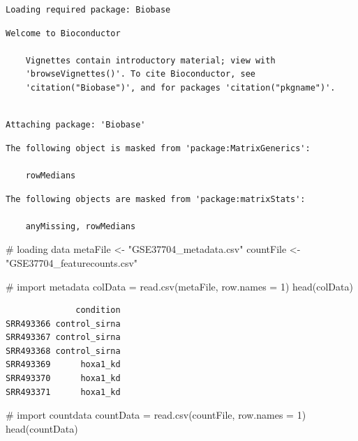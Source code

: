 \documentclass[
  letterpaper,
  DIV=11,
  numbers=noendperiod]{scrartcl}
\newenvironment{Shaded}{\begin{snugshade}}{\end{snugshade}}
\newcommand{\AttributeTok}[1]{\textcolor[rgb]{0.40,0.45,0.13}{#1}}
\newcommand{\CommentTok}[1]{\textcolor[rgb]{0.37,0.37,0.37}{#1}}
\newcommand{\DecValTok}[1]{\textcolor[rgb]{0.68,0.00,0.00}{#1}}
\newcommand{\FunctionTok}[1]{\textcolor[rgb]{0.28,0.35,0.67}{#1}}
\newcommand{\NormalTok}[1]{\textcolor[rgb]{0.00,0.23,0.31}{#1}}
\newcommand{\OtherTok}[1]{\textcolor[rgb]{0.00,0.23,0.31}{#1}}
\newcommand{\StringTok}[1]{\textcolor[rgb]{0.13,0.47,0.30}{#1}}
\begin{document}
\begin{verbatim}
Loading required package: Biobase
\end{verbatim}

\begin{verbatim}
Welcome to Bioconductor

    Vignettes contain introductory material; view with
    'browseVignettes()'. To cite Bioconductor, see
    'citation("Biobase")', and for packages 'citation("pkgname")'.
\end{verbatim}

\begin{verbatim}

Attaching package: 'Biobase'
\end{verbatim}

\begin{verbatim}
The following object is masked from 'package:MatrixGenerics':

    rowMedians
\end{verbatim}

\begin{verbatim}
The following objects are masked from 'package:matrixStats':

    anyMissing, rowMedians
\end{verbatim}

\begin{Shaded}
\begin{Highlighting}[]
\CommentTok{\# loading data}
\NormalTok{metaFile }\OtherTok{\textless{}{-}} \StringTok{"GSE37704\_metadata.csv"}
\NormalTok{countFile }\OtherTok{\textless{}{-}} \StringTok{"GSE37704\_featurecounts.csv"}

\CommentTok{\# import metadata}
\NormalTok{colData }\OtherTok{=} \FunctionTok{read.csv}\NormalTok{(metaFile, }\AttributeTok{row.names =} \DecValTok{1}\NormalTok{)}
\FunctionTok{head}\NormalTok{(colData)}
\end{Highlighting}
\end{Shaded}

\begin{verbatim}
              condition
SRR493366 control_sirna
SRR493367 control_sirna
SRR493368 control_sirna
SRR493369      hoxa1_kd
SRR493370      hoxa1_kd
SRR493371      hoxa1_kd
\end{verbatim}

\begin{Shaded}
\begin{Highlighting}[]
\CommentTok{\# import countdata}
\NormalTok{countData }\OtherTok{=} \FunctionTok{read.csv}\NormalTok{(countFile, }\AttributeTok{row.names =} \DecValTok{1}\NormalTok{)}
\FunctionTok{head}\NormalTok{(countData)}
\end{Highlighting}
\end{Shaded}
\end{document}
